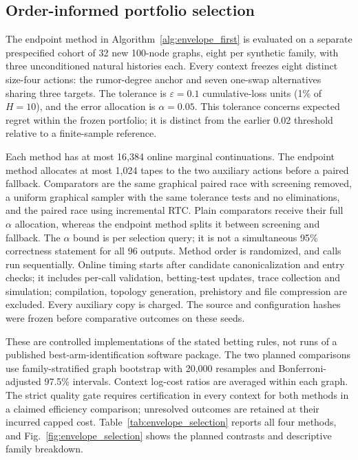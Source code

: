 \documentclass[preprint,11pt,sort&compress]{elsarticle}
\begin{document}
\subsection{Order-informed portfolio selection}
\label{sec:envelope_experiment}
The endpoint method in Algorithm~\ref{alg:envelope_first} is evaluated on a separate prespecified cohort of 32 new 100-node graphs, eight per synthetic family, with three unconditioned natural histories each. Every context freezes eight distinct size-four actions: the rumor-degree anchor and seven one-swap alternatives sharing three targets. The tolerance is $\varepsilon=0.1$ cumulative-loss units (1\% of $H=10$), and the error allocation is $\alpha=0.05$. This tolerance concerns expected regret within the frozen portfolio; it is distinct from the earlier 0.02 threshold relative to a finite-sample reference.

Each method has at most 16,384 online marginal continuations. The endpoint method allocates at most 1,024 tapes to the two auxiliary actions before a paired fallback. Comparators are the same graphical paired race with screening removed, a uniform graphical sampler with the same tolerance tests and no eliminations, and the paired race using incremental RTC. Plain comparators receive their full $\alpha$ allocation, whereas the endpoint method splits it between screening and fallback. The $\alpha$ bound is per selection query; it is not a simultaneous 95\% correctness statement for all 96 outputs. Method order is randomized, and calls run sequentially. Online timing starts after candidate canonicalization and entry checks; it includes per-call validation, betting-test updates, trace collection and simulation; compilation, topology generation, prehistory and file compression are excluded. Every auxiliary copy is charged. The source and configuration hashes were frozen before comparative outcomes on these seeds.

These are controlled implementations of the stated betting rules, not runs of a published best-arm-identification software package. The two planned comparisons use family-stratified graph bootstrap with 20,000 resamples and Bonferroni-adjusted 97.5\% intervals. Context log-cost ratios are averaged within each graph. The strict quality gate requires certification in every context for both methods in a claimed efficiency comparison; unresolved outcomes are retained at their incurred capped cost. Table~\ref{tab:envelope_selection} reports all four methods, and Fig.~\ref{fig:envelope_selection} shows the planned contrasts and descriptive family breakdown.
\end{document}
